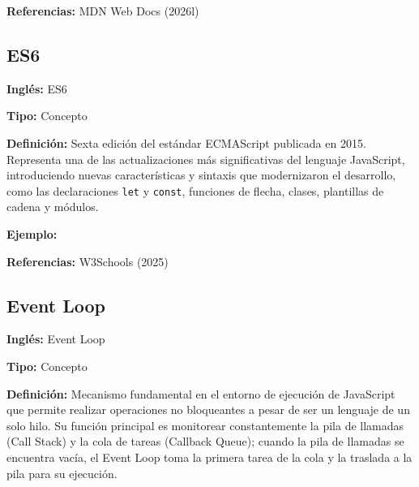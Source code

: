 \documentclass[
  letterpaper,
  DIV=11,
  numbers=noendperiod]{scrreprt}
\newenvironment{Shaded}{\begin{snugshade}}{\end{snugshade}}
\newcommand{\BuiltInTok}[1]{\textcolor[rgb]{0.00,0.23,0.31}{#1}}
\newcommand{\CommentTok}[1]{\textcolor[rgb]{0.37,0.37,0.37}{#1}}
\newcommand{\FunctionTok}[1]{\textcolor[rgb]{0.28,0.35,0.67}{#1}}
\newcommand{\KeywordTok}[1]{\textcolor[rgb]{0.00,0.23,0.31}{\textbf{#1}}}
\newcommand{\NormalTok}[1]{\textcolor[rgb]{0.00,0.23,0.31}{#1}}
\newcommand{\OperatorTok}[1]{\textcolor[rgb]{0.37,0.37,0.37}{#1}}
\newcommand{\SpecialCharTok}[1]{\textcolor[rgb]{0.37,0.37,0.37}{#1}}
\newcommand{\StringTok}[1]{\textcolor[rgb]{0.13,0.47,0.30}{#1}}
\newcommand{\VerbatimStringTok}[1]{\textcolor[rgb]{0.13,0.47,0.30}{#1}}
\let\oldsubsection\subsection
\renewcommand{\subsection}{\phantomsection\oldsubsection}
\begin{document}
\textbf{Referencias:} MDN Web Docs (2026l)

\subsection*{ES6}\label{glos-es6}

\textbf{Inglés:} ES6

\textbf{Tipo:} Concepto

\textbf{Definición:} Sexta edición del estándar ECMAScript publicada en
2015. Representa una de las actualizaciones más significativas del
lenguaje JavaScript, introduciendo nuevas características y sintaxis que
modernizaron el desarrollo, como las declaraciones \texttt{let} y
\texttt{const}, funciones de flecha, clases, plantillas de cadena y
módulos.

\textbf{Ejemplo:}

\begin{Shaded}
\end{Shaded}

\textbf{Referencias:} W3Schools (2025)

\subsection*{Event Loop}\label{glos-event_loop}

\textbf{Inglés:} Event Loop

\textbf{Tipo:} Concepto

\textbf{Definición:} Mecanismo fundamental en el entorno de ejecución de
JavaScript que permite realizar operaciones no bloqueantes a pesar de
ser un lenguaje de un solo hilo. Su función principal es monitorear
constantemente la pila de llamadas (Call Stack) y la cola de tareas
(Callback Queue); cuando la pila de llamadas se encuentra vacía, el
Event Loop toma la primera tarea de la cola y la traslada a la pila para
su ejecución.
\end{document}
